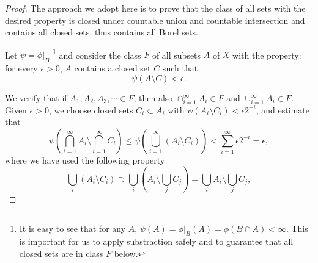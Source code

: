 \begin{proof} %
The approach we adopt here is to prove that the class of all sets with the
desired property is closed under countable union and countable intersection and 
contains all closed sets, thus contains all Borel sets.

Let $\psi=\phi|_B$ 
\footnote{
  It is easy to see that for any $A$, $\psi(A)=\phi|_B(A)=\phi(B\cap A)<\infty$.
  This is important for us to apply substraction safely and to guarantee that 
  all closed sets are in class $F$ below.
}
and consider the class $F$ of all subsets $A$ of $X$ with the
property: for every $\epsilon>0$, $A$ contains a closed set $C$ such that 
\[
  \psi(A\setminus C)<\epsilon.
\]

We verify that if $A_1,A_2,A_3,\cdots\in F$, then also 
$\cap_{i=1}^{\infty} A_i \in F$ and $\cup_{i=1}^{\infty} A_i \in F$.
Given $\epsilon>0$, we choose closed sets $C_i\subset A_i$ with 
$\psi(A_i\setminus C_i)<\epsilon 2^{-i}$, and estimate that
\[
  \psi \left( \bigcap_{i=1}^{\infty} A_i\setminus 
       \bigcap_{i=1}^{\infty} C_i \right)
    \leq \psi \left( \bigcup_{i=1}^{\infty} ( A_i\setminus C_i ) \right)
    < \sum_{i=1}^{\infty} \epsilon 2^{-i} = \epsilon,
\]
where we have used the following property
\[
  \bigcup_i ( A_i\setminus C_i )
    \supset \bigcup_i \left( A_i\setminus \bigcup_j C_j \right) 
    = \bigcup_i A_i\setminus \bigcup_j C_j,
\]


\end{proof}
